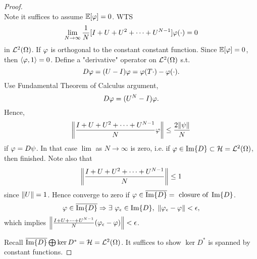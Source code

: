 \begin{proof}\ \\
Note it suffices to assume $\mathbb{E}[\varphi] = 0$. WTS 
\begin{equation*}
    \lim_{N \to \infty} \frac{1}{N} [I + U + U^2 + \dots + U^{N-1}] \varphi(\cdot) = 0
\end{equation*}
in $\mathcal{L}^2(\Omega)$. If $\varphi$ is orthogonal to the constant constant function. Since $\mathbb{E}[\varphi] = 0$, then $\left\langle \varphi, 1 \right\rangle = 0$. Define a "derivative" operator on $\mathcal{L}^2(\Omega)$ s.t.
\begin{equation*}
    D \varphi = (U - I) \varphi = \varphi(T \cdot) - \varphi(\cdot).
\end{equation*}
Use Fundamental Theorem of Calculus argument,
\begin{equation*}
    [I + U + U^2 + \dots + U^{N-1}] D\vphi = (U^N - I) \vphi.
\end{equation*}
Hence,
\begin{equation*}
    \norm{\frac{I + U + U^2 + \dots + U^{N-1}}{N} \varphi} \leq \frac{2 \norm{\psi}}{N}
\end{equation*}
if $\varphi = D \psi$. In that case $\lim$ as $N \to \infty$ is zero, i.e. if $\varphi \in \Im{D} \subset \mathcal{H} = \mathcal{L}^2(\Omega)$, then finished. Note also that
\begin{equation*}
    \norm{\frac{I + U + U^2 + \dots + U^{N-1}}{N}} \leq 1
\end{equation*}
since $\norm{U} = 1$. Hence converge to zero if $\varphi \in \overline{\Im{D}} = \text{ closure of } \Im{D}$. 
\begin{equation*}
    \vphi \in \bar{\Im{D}} \Rightarrow \exists\ \vphi_\ep \in \Im{D},\ \norm{\vphi_\ep - \vphi} < \ep,
\end{equation*}
which implies $\norm{\frac{I + U + \dots + U^{N-1}}{N} (\varphi_\epsilon - \varphi)} < \epsilon$.

\np Recall $\overline{\Im{D}} \bigoplus \ker{D^*} = \mathcal{H} = \mathcal{L}^2(\Omega)$. It suffices to show $\ker{D^*}$ is spanned by constant functions. 


\end{proof}
